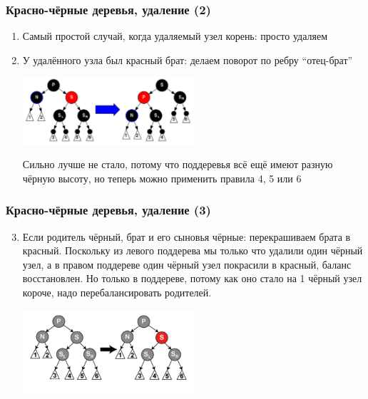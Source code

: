 \documentclass[xetex,mathserif,serif]{beamer}
\begin{document}
    \begin{frame}
        \frametitle{Красно-чёрные деревья, удаление (2)}
        \begin{enumerate}
            \item Самый простой случай, когда удаляемый узел корень: просто удаляем
            \item У удалённого узла был красный брат: делаем поворот по ребру ``отец-брат''
            \begin{center}
                \includegraphics[width=0.5\textwidth]{deletion-from-red-black-tree.png}
            \end{center}
            Сильно лучше не стало, потому что поддеревья всё ещё имеют разную чёрную высоту, но теперь можно применить правила 4, 5 или 6
        \end{enumerate}
    \end{frame}

    \begin{frame}
        \frametitle{Красно-чёрные деревья, удаление (3)}
        \begin{enumerate}
            \setcounter{enumi}{2}
            \item Если родитель чёрный, брат и его сыновья чёрные: перекрашиваем брата в красный. Поскольку из левого поддерева мы только что удалили один чёрный узел, а в правом поддереве один чёрный узел покрасили в красный, баланс восстановлен. Но только в поддереве, потому как оно стало на 1 чёрный узел короче, надо перебалансировать родителей.
            \begin{center}
                \includegraphics[width=0.5\textwidth]{deletion-from-red-black-tree2.png}
            \end{center}
        \end{enumerate}
    \end{frame}
\end{document}
